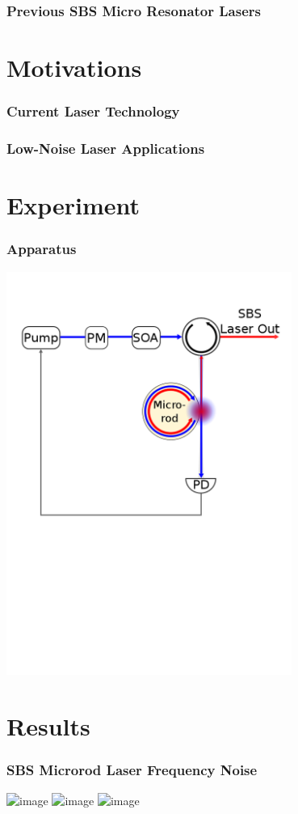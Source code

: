 \documentclass{beamer}
\begin{document}
\begin{frame}\frametitle{Previous SBS Micro Resonator Lasers}
\end{frame}

\section{Motivations}

\begin{frame}\frametitle{Current Laser Technology}
\end{frame}

\begin{frame}\frametitle{Low-Noise Laser Applications}
\end{frame}



\section{Experiment}
\begin{frame}\frametitle{Apparatus}
\includegraphics[width=0.7\textwidth]{Images/SBS_Microrod_Schematic.png}
\end{frame}

\section{Results}
\begin{frame}\frametitle{SBS Microrod Laser Frequency Noise}
\includegraphics<1>[width=1.05\textwidth]{Images/Freq_Noise_Comparison_Plot1.png}
\includegraphics<2>[width=1.05\textwidth]{Images/Freq_Noise_Comparison_Plot2.png}
\includegraphics<3>[width=1.05\textwidth]{Images/Freq_Noise_Comparison_Plot3.png}
\end{frame}
\end{document}
